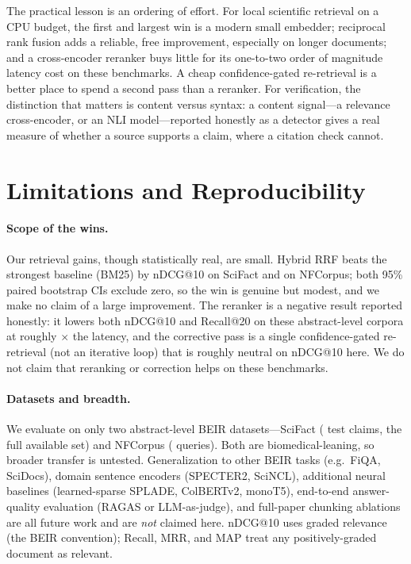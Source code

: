 \documentclass[11pt]{article}
\begin{document}
The practical lesson is an ordering of effort. For local scientific retrieval on
a CPU budget, the first and largest win is a modern small embedder; reciprocal
rank fusion adds a reliable, free improvement, especially on longer documents;
and a cross-encoder reranker buys little for its one-to-two order of magnitude
latency cost on these benchmarks. A cheap confidence-gated re-retrieval is a
better place to spend a second pass than a reranker. For verification, the
distinction that matters is content versus syntax: a content signal---a relevance
cross-encoder, or an NLI model---reported honestly as a detector gives a real
measure of whether a source supports a claim, where a citation check cannot.

\section{Limitations and Reproducibility}

\paragraph{Scope of the wins.} Our retrieval gains, though statistically real,
are small. Hybrid RRF beats the strongest baseline (BM25) by \SciHybridDelta{}
nDCG@10 \SciHybridDeltaCI{} on SciFact and \NFhybridDelta{} \NFhybridDeltaCI{} on
NFCorpus; both 95\% paired bootstrap CIs exclude zero, so the win is genuine but
modest, and we make no claim of a large improvement. The reranker is a negative
result reported honestly: it lowers both nDCG@10 and Recall@20 on these
abstract-level corpora at roughly \RerankSlowdown$\times$ the latency, and the
corrective pass is a single confidence-gated re-retrieval (not an iterative loop)
that is roughly neutral on nDCG@10 here. We do not claim that reranking or
correction helps on these benchmarks.

\paragraph{Datasets and breadth.} We evaluate on only two abstract-level BEIR
datasets---SciFact (\NumQueries{} test claims, the full available set) and
NFCorpus (\NFqueries{} queries). Both are biomedical-leaning, so broader transfer
is untested. Generalization to other BEIR tasks (e.g.\ FiQA, SciDocs), domain
sentence encoders (SPECTER2, SciNCL), additional neural baselines (learned-sparse
SPLADE, ColBERTv2, monoT5), end-to-end answer-quality evaluation (RAGAS or
LLM-as-judge), and full-paper chunking ablations are all future work and are
\emph{not} claimed here. nDCG@10 uses graded relevance (the BEIR convention);
Recall, MRR, and MAP treat any positively-graded document as relevant.
\end{document}
